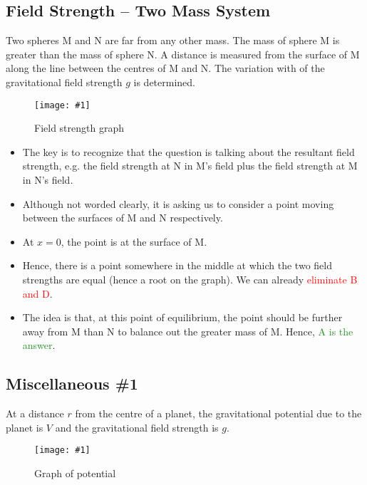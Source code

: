 \documentclass[a4paper,12pt]{article}
\newcommand{\img}[4]{\begin{center}
  \begin{figure}[H]
    \centering
    \texttt{[image: \#1]}
    \caption{#3}
    \label{fig:#4}
  \end{figure}
\end{center}}
\begin{document}
\pagebreak

\subsection{Field Strength -- Two Mass System}

Two spheres M and N are far from any other mass. The mass of sphere M is greater than the mass of sphere N.
A distance is measured from the surface of M along the line between the centres of M and N. The variation with of the gravitational field strength $g$ is determined.

\img{ex/2.png}{0.6}{Field strength graph}{ex2}

\begin{itemize}
  \item The key is to recognize that the question is talking about the resultant field strength, e.g. the field strength at N in M's field plus the field strength at M in N's field.
  \item Although not worded clearly, it is asking us to consider a point moving between the surfaces of M and N respectively.
  \item At $x = 0$, the point is at the surface of M.
  \item Hence, there is a point somewhere in the middle at which the two field strengths are equal (hence a root on the graph). We can already \textcolor{red}{eliminate B and D}.
  \item The idea is that, at this point of equilibrium, the point should be further away from M than N to balance out the greater mass of M. Hence, \textcolor{ForestGreen}{A is the answer}.
\end{itemize}

\pagebreak

\subsection{Miscellaneous \#1}

At a distance $r$ from the centre of a planet, the gravitational potential due to the planet is $V$ and the gravitational field strength is $g$.
\img{ex/3.png}{0.9}{Graph of potential}{ex3}
\end{document}
